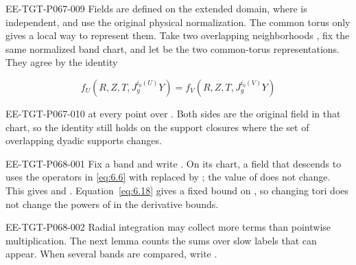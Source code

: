 \begin{EESegment}{EE-TGT-P067-009}
Fields are defined on the extended domain, where  is independent, and use the original physical normalization. The common torus only gives a local way to represent them. Take two overlapping neighborhoods , fix the same normalized band chart, and let  be the two common-torus representations. They agree by the identity
\end{EESegment}
\begin{equation}
  f_U(R,Z,T,J_g^{i_0(U)}Y)=f_V(R,Z,T,J_g^{i_0(V)}Y)
  \tag{6.20}\label{eq:6.20}
\end{equation}
\begin{EESegment}{EE-TGT-P067-010}
at every point over . Both sides are the original field in that chart, so the identity still holds on the support closures where the set of overlapping dyadic supports changes.
\end{EESegment}

%
\begin{EESegment}{EE-TGT-P068-001}
Fix a band  and write . On its chart, a field that descends to  uses the operators in \eqref{eq:6.6} with  replaced by ; the value of  does not change. This gives  and . Equation~\eqref{eq:6.18} gives a fixed bound on , so changing tori does not change the powers of  in the derivative bounds.
\end{EESegment}

\begin{EESegment}{EE-TGT-P068-002}
Radial integration may collect more terms than pointwise multiplication. The next lemma counts the sums over slow labels that can appear. When several bands are compared, write .
\end{EESegment}

